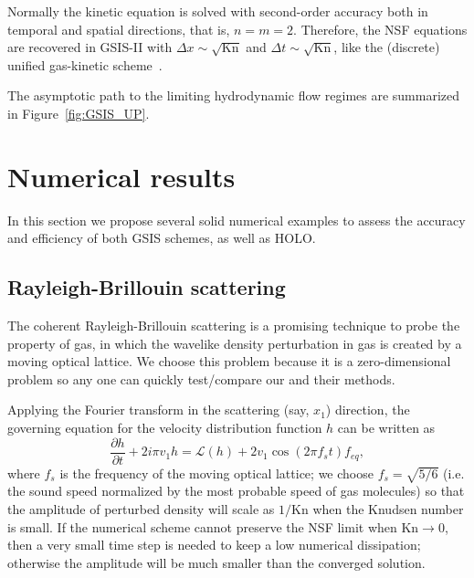 \documentclass[onefignum,onetabnum]{siamart171218}
\newcounter{example}
\begin{document}
Normally the kinetic equation is solved with second-order accuracy both in temporal and spatial directions,  that is, $n=m=2$. Therefore, the NSF equations are recovered in GSIS-II with $\Delta{x}\sim\sqrt{\text{Kn}}$ and $\Delta{t}\sim\sqrt{\text{Kn}}$, like the (discrete) unified gas-kinetic scheme~\cite{UGKS2010JCP,guo2013discrete,Guo2019UP_arXiv}.



The asymptotic path to the limiting hydrodynamic flow regimes are summarized in Figure~\ref{fig:GSIS_UP}. %




\section{Numerical results}\label{section_numerical}

In this section we propose several solid numerical examples to assess the accuracy and efficiency of both GSIS schemes, as well as HOLO. 

\subsection{Rayleigh-Brillouin scattering}\label{Osci_CRBS}

 The coherent Rayleigh-Brillouin scattering is a promising technique to probe the property of gas, in which the wavelike density perturbation in gas is created by a moving optical lattice. We choose this problem because it is a zero-dimensional problem so any one can quickly test/compare our and their methods. 
 
 Applying the Fourier transform in the scattering (say, $x_1$) direction, the governing equation for the velocity distribution function $h$ can be written as~\cite{Wu2020AIA}
\begin{equation}\label{CRBS_LBE}
\frac{\partial {h}}{\partial {t}}+2i\pi{}v_1h
=\mathcal{L}(h)
+2v_1\cos(2\pi{f_s}t)f_{eq},
\end{equation}
where $f_s$ is the frequency of the moving optical lattice; we choose $f_s=\sqrt{5/6}$ (i.e. the sound speed normalized by the most probable speed of gas molecules) so that the amplitude of perturbed density will scale as $1/\text{Kn}$ when the Knudsen number is small. If the numerical scheme cannot preserve the NSF limit when $\text{Kn}\rightarrow0$, then a very small time step is needed to keep a low numerical dissipation; otherwise the amplitude will be much smaller than the converged solution.  
\end{document}
